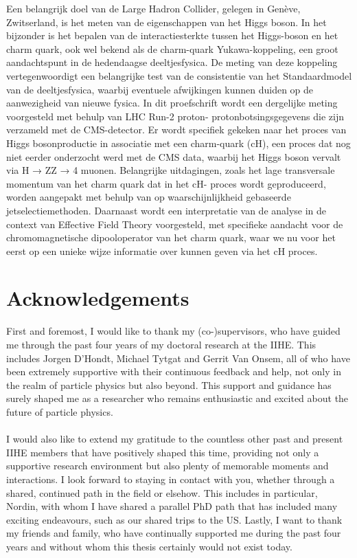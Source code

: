 \documentclass[a4paper]{book}
\begin{document}
Een belangrijk doel van de Large Hadron Collider, gelegen in Genève, Zwitserland, is het meten van
de eigenschappen van het Higgs boson. In het bijzonder is het bepalen van de interactiesterkte tussen
het Higgs-boson en het charm quark, ook wel bekend als de charm-quark Yukawa-koppeling, een
groot aandachtspunt in de hedendaagse deeltjesfysica. De meting van deze koppeling
vertegenwoordigt een belangrijke test van de consistentie van het Standaardmodel van de
deeltjesfysica, waarbij eventuele afwijkingen kunnen duiden op de aanwezigheid van nieuwe fysica.
In dit proefschrift wordt een dergelijke meting voorgesteld met behulp van LHC Run-2 proton-
protonbotsingsgegevens die zijn verzameld met de CMS-detector. Er wordt specifiek gekeken naar
het proces van Higgs bosonproductie in associatie met een charm-quark (cH), een proces dat nog niet
eerder onderzocht werd met de CMS data, waarbij het Higgs boson vervalt via H → ZZ → 4 muonen.
Belangrijke uitdagingen, zoals het lage transversale momentum van het charm quark dat in het cH-
proces wordt geproduceerd, worden aangepakt met behulp van op waarschijnlijkheid gebaseerde
jetselectiemethoden. Daarnaast wordt een interpretatie van de analyse in de context van Effective
Field Theory voorgesteld, met specifieke aandacht voor de chromomagnetische dipooloperator van
het charm quark, waar we nu voor het eerst op een unieke wijze informatie over kunnen geven via
het cH proces.

\chapter{Acknowledgements}
First and foremost, I would like to thank my (co-)supervisors, who have guided me through the past four years of my doctoral research at the IIHE. This includes Jorgen D'Hondt, Michael Tytgat and Gerrit Van Onsem, all of who have been extremely supportive with their continuous feedback and help, not only in the realm of particle physics but also beyond. This support and guidance has surely shaped me as a researcher who remains enthusiastic and excited about the future of particle physics. \\
\\
I would also like to extend my gratitude to the countless other past and present IIHE members that have positively shaped this time, providing not only a supportive research environment but also plenty of memorable moments and interactions. I look forward to staying in contact with you, whether through a shared, continued path in the field or elsehow. This includes in particular, Nordin, with whom I have shared a parallel PhD path that has included many exciting endeavours, such as our shared trips to the US. Lastly, I want to thank my friends and family, who have continually supported me during the past four years and without whom this thesis certainly would not exist today. 
\end{document}

